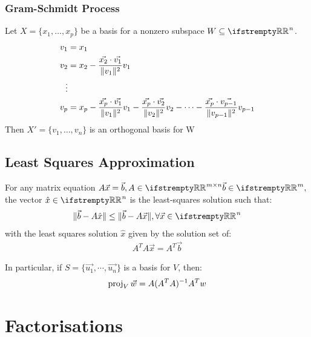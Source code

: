 \documentclass[12pt, a4paper]{article}
\begin{document}
\begin{multicols*}{3}
\subsubsection{Gram-Schmidt Process}
Let $X = \{x_1,\ldots,x_p\}$ be a basis for a nonzero subspace $W \subseteq \RR^n$.
\begin{align*}
  v_1 &= x_1 \\
  v_2 &= x_2 - \frac{\vec{x_2}\cdot\vec{v_1}}{\lVert v_1\rVert^2}v_1 \\
  \vdots \\
  v_p &= x_p - \frac{\vec{x_p}\cdot\vec{v_1}}{\lVert v_1\rVert^2}v_1 - \frac{\vec{x_p}\cdot\vec{v_2}}{\lVert v_2\rVert^2}v_2 - \cdots -  \frac{\vec{x_p}\cdot\vec{v_{p-1}}}{\lVert v_{p-1}\rVert^2}v_{p-1}    
\end{align*}
Then $X' = \{v_1,\ldots,v_n\}$ is an orthogonal basis for W

\subsection{Least Squares Approximation}
For any matrix equation $A\vec{x} = \vec{b}, A \in \RR^{m{\times}n} \vec{b} \in \RR^m,$ the vector $\hat{x} \in \RR^n$ is the least-squares solution such that:
\begin{align*}
  \norm{\vec{b} - A\hat{x}} \leq \norm{\vec{b} - A\vec{x}}, \forall \vec{x} \in \RR^n
\end{align*}
with the least squares solution $\hat{x}$ given by the solution set of:
\begin{align*}
  A^TA\vec{x} = A^T\vec{b}
\end{align*}

In particular, if $S = \{\vec{u_1},\cdots,\vec{u_n}\}$ is a basis for $V$, then:
\begin{align*}
  \operatorname{proj}_V \vec{w} = A(A^TA)^{-1}A^Tw
\end{align*}

\colbreak

\section{Factorisations}


\end{multicols*}
\end{document}
